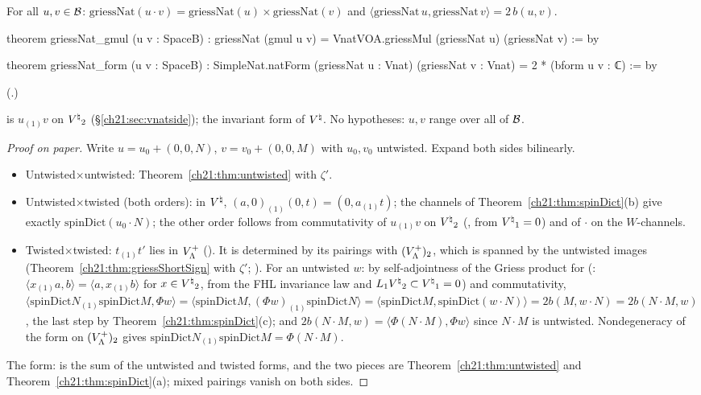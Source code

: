 \begin{theorem}\label{ch21:thm:griessNat}
For all $u,v\in\mathcal{B}$: $\mathrm{griessNat}(u\cdot v)=\mathrm{griessNat}(u)\times\mathrm{griessNat}(v)$
and $\langle\mathrm{griessNat}\,u,\mathrm{griessNat}\,v\rangle=2\,b(u,v)$.
\end{theorem}
\begin{leancode}
theorem griessNat_gmul (u v : SpaceB) :
    griessNat (gmul u v) = VnatVOA.griessMul (griessNat u) (griessNat v) := by
\end{leancode}
\begin{leancode}
theorem griessNat_form (u v : SpaceB) :
    SimpleNat.natForm (griessNat u : Vnat) (griessNat v : Vnat) = 2 * (bform u v : ℂ) := by
\end{leancode}
(.)
\begin{dictionary}
 is $u_{(1)}v$ on ${V^{\natural}}_2$ (\S\ref{ch21:sec:vnatside});  the
invariant form of ${V^{\natural}}$.  No hypotheses: $u,v$ range over all of $\mathcal{B}$.
\end{dictionary}
\begin{proof}[Proof on paper]
Write $u=u_0+(0,0,N)$, $v=v_0+(0,0,M)$ with $u_0,v_0$ untwisted.  Expand both sides bilinearly.
\begin{itemize}
\item Untwisted$\times$untwisted: Theorem~\ref{ch21:thm:untwisted} with $\zeta'$.
\item Untwisted$\times$twisted (both orders): in ${V^{\natural}}$, $(a,0)_{(1)}(0,t)=(0,a_{(1)}t)$; the
  channels of Theorem~\ref{ch21:thm:spinDict}(b) give exactly $\mathrm{spinDict}(u_0\cdot N)$; the other
  order follows from commutativity of $u_{(1)}v$ on ${V^{\natural}}_2$ (, from ${V^{\natural}}_1=0$)
  and of $\cdot$ on the $W$-channels.
\item Twisted$\times$twisted: $t_{(1)}t'$ lies in $V_{\Lambda}^+$ ().
  It is determined by its pairings with $(V_{\Lambda}^+)_2$, which is spanned by the untwisted images
  (Theorem~\ref{ch21:thm:griessShortSign} with $\zeta'$; ).  For an
  untwisted $w$: by self-adjointness of the Griess product for 
  (: $\langle x_{(1)}a,b\rangle=\langle a,x_{(1)}b\rangle$ for $x\in{V^{\natural}}_2$,
  from the FHL invariance law and $L_1{V^{\natural}}_2\subset{V^{\natural}}_1=0$) and commutativity,
  $\langle\mathrm{spinDict}N_{(1)}\mathrm{spinDict}M,\Phi w\rangle=\langle\mathrm{spinDict}M,(\Phi w)_{(1)}\mathrm{spinDict}N\rangle
  =\langle\mathrm{spinDict}M,\mathrm{spinDict}(w\cdot N)\rangle=2b(M,w\cdot N)=2b(N\cdot M,w)$,
  the last step by Theorem~\ref{ch21:thm:spinDict}(c); and $2b(N\cdot M,w)=\langle\Phi(N\cdot M),\Phi w\rangle$
  since $N\cdot M$ is untwisted.  Nondegeneracy of the form on $(V_{\Lambda}^+)_2$ gives
  $\mathrm{spinDict}N_{(1)}\mathrm{spinDict}M=\Phi(N\cdot M)$.
\end{itemize}
The form:  is the sum of the untwisted and twisted forms, and the two pieces are
Theorem~\ref{ch21:thm:untwisted} and Theorem~\ref{ch21:thm:spinDict}(a); mixed pairings vanish on both
sides.
\end{proof}
